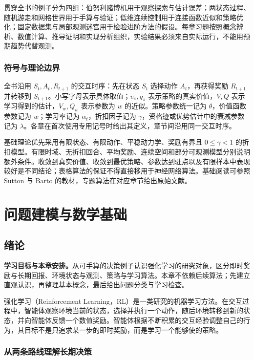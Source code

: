 \documentclass[UTF8,12pt,a4paper,fontset=fandol]{ctexbook}
\begin{document}
贯穿全书的例子分为四组：伯努利赌博机用于观察探索与估计误差；两状态过程、随机游走和网格世界用于手算与验证；低维连续控制用于连接函数近似和策略优化；固定数据集与局部观测迷宫用于检验进阶方法的假设。每章习题按照概念辨析、数值计算、推导证明和实现分析组织，实验结果必须来自实际运行，不能用预期趋势代替观测。

\section*{符号与理论边界}

全书沿用 $S_t,A_t,R_{t+1}$ 的交互时序：先在状态 $S_t$ 选择动作 $A_t$，再获得奖励 $R_{t+1}$ 并转移到 $S_{t+1}$。小写字母表示具体取值；$v_\pi,q_\pi$ 表示策略的真实价值，$V,Q$ 表示学习得到的估计，$V_w,Q_w$ 表示参数为 $w$ 的近似。策略参数统一记为 $\theta$，价值函数参数记为 $w$；学习率记为 $\alpha_t$，折扣因子记为 $\gamma$，资格迹或优势估计中的衰减参数记为 $\lambda$。各章在首次使用专用记号时给出其定义，章节间沿用同一交互时序。

基础理论优先采用有限状态、有限动作、平稳动力学、奖励有界且 $0\leq\gamma<1$ 的折扣模型。有限时域、无折扣回合、平均奖励、连续空间和部分可观测模型分别说明额外条件。收敛到真实价值、收敛到最优策略、参数达到驻点以及有限样本中表现较好是不同结论；表格算法的保证不得直接移用于神经网络算法。基础阅读可参照 Sutton 与 Barto 的教材\cite{sutton-barto}，专题算法在对应章节给出原始文献。

\part{问题建模与数学基础}

\chapter{绪论}
\label{ch:rl-introduction}

\textbf{学习目标与本章安排。}从可手算的决策例子认识强化学习的研究对象，区分即时奖励与长期回报、环境状态与观测、策略与学习算法。本章不依赖后续算法；先建立直观认识，再整理基本概念，最后给出问题分类与学习检查。

强化学习（Reinforcement Learning，RL）是一类研究的机器学习方法。在交互过程中，智能体观察环境当前的状态，选择并执行一个动作，随后环境转移到新的状态，并向智能体反馈一个数值奖励。智能体根据不断积累的交互经验调整自己的行为，其目标不是只追求某一步的即时奖励，而是学习一个能够使的策略。

\section{从两条路线理解长期决策}
\end{document}
